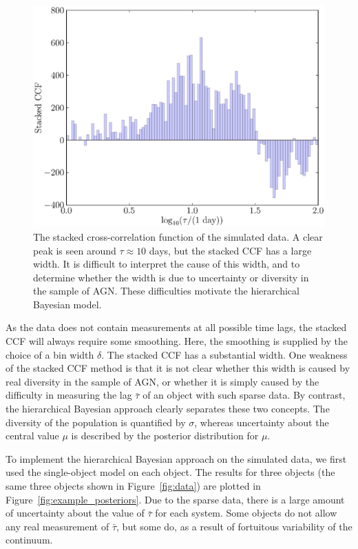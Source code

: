 \documentclass[useAMS,usenatbib]{mn2e}
\begin{document}
\begin{figure}
\begin{center}
\includegraphics[scale=0.4]{Figures/ccf.eps}
\caption{The stacked cross-correlation function of the simulated data.
A clear peak is seen around $\tau \approx 10$ days, but the stacked CCF has a
large width. It is difficult to interpret the cause of this width, and to
determine whether the width is due to uncertainty or diversity in the sample
of AGN. These difficulties motivate the hierarchical Bayesian model.
\label{fig:ccf}}
\end{center}
\end{figure}

As the data does not contain measurements at all possible time lags, the stacked
CCF will always require some smoothing. Here, the smoothing is supplied by the
choice of a bin width $\delta$. The stacked CCF has a substantial width. One
weakness of the stacked CCF method is that it is not clear whether this width
is caused by real diversity in the sample of AGN, or whether it is simply caused
by the difficulty in measuring the lag $\bar{\tau}$ of an object with such
sparse data. By contrast, the hierarchical Bayesian approach clearly separates
these two concepts. The diversity of the population is quantified by $\sigma$,
whereas uncertainty about the central value $\mu$ is described by the
posterior distribution for $\mu$.

To implement the hierarchical Bayesian approach on the simulated data, we first
used the single-object model on each object. The results for three objects
(the same three objects shown in Figure~\ref{fig:data}) are plotted in
Figure~\ref{fig:example_posteriors}. Due to the sparse data, there is a large
amount of uncertainty about the value of $\bar{\tau}$ for each system. Some
objects do not allow any real measurement of $\bar{\tau}$, but some do, as a
result of fortuitous variability of the continuum.
\end{document}
